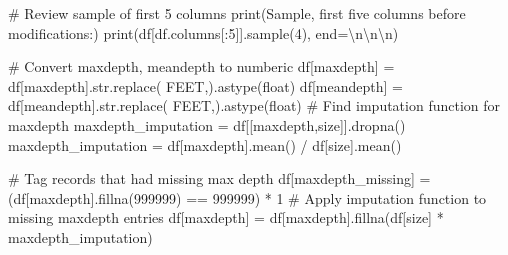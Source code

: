 \documentclass[
]{article}
\newenvironment{Shaded}{\begin{snugshade}}{\end{snugshade}}
\newcommand{\BuiltInTok}[1]{\textcolor[rgb]{0.00,0.23,0.31}{#1}}
\newcommand{\CharTok}[1]{\textcolor[rgb]{0.13,0.47,0.30}{#1}}
\newcommand{\CommentTok}[1]{\textcolor[rgb]{0.37,0.37,0.37}{#1}}
\newcommand{\DecValTok}[1]{\textcolor[rgb]{0.68,0.00,0.00}{#1}}
\newcommand{\NormalTok}[1]{\textcolor[rgb]{0.00,0.23,0.31}{#1}}
\newcommand{\OperatorTok}[1]{\textcolor[rgb]{0.37,0.37,0.37}{#1}}
\newcommand{\StringTok}[1]{\textcolor[rgb]{0.13,0.47,0.30}{#1}}
\begin{document}
\begin{Shaded}
\begin{Highlighting}[]
\CommentTok{\# Review sample of first 5 columns}
\BuiltInTok{print}\NormalTok{(}\StringTok{\textquotesingle{}Sample, first five columns before modifications:\textquotesingle{}}\NormalTok{)}
\BuiltInTok{print}\NormalTok{(df[df.columns[:}\DecValTok{5}\NormalTok{]].sample(}\DecValTok{4}\NormalTok{), end}\OperatorTok{=}\StringTok{\textquotesingle{}}\CharTok{\textbackslash{}n\textbackslash{}n\textbackslash{}n}\StringTok{\textquotesingle{}}\NormalTok{)}

\CommentTok{\# Convert maxdepth, meandepth to numberic}
\NormalTok{df[}\StringTok{\textquotesingle{}maxdepth\textquotesingle{}}\NormalTok{] }\OperatorTok{=}\NormalTok{ df[}\StringTok{\textquotesingle{}maxdepth\textquotesingle{}}\NormalTok{].}\BuiltInTok{str}\NormalTok{.replace(}\StringTok{\textquotesingle{} FEET\textquotesingle{}}\NormalTok{,}\StringTok{\textquotesingle{}\textquotesingle{}}\NormalTok{).astype(}\StringTok{\textquotesingle{}float\textquotesingle{}}\NormalTok{)}
\NormalTok{df[}\StringTok{\textquotesingle{}meandepth\textquotesingle{}}\NormalTok{] }\OperatorTok{=}\NormalTok{ df[}\StringTok{\textquotesingle{}meandepth\textquotesingle{}}\NormalTok{].}\BuiltInTok{str}\NormalTok{.replace(}\StringTok{\textquotesingle{} FEET\textquotesingle{}}\NormalTok{,}\StringTok{\textquotesingle{}\textquotesingle{}}\NormalTok{).astype(}\StringTok{\textquotesingle{}float\textquotesingle{}}\NormalTok{)}
\CommentTok{\# Find imputation function for maxdepth}
\NormalTok{maxdepth\_imputation }\OperatorTok{=}\NormalTok{ df[[}\StringTok{\textquotesingle{}maxdepth\textquotesingle{}}\NormalTok{,}\StringTok{\textquotesingle{}size\textquotesingle{}}\NormalTok{]].dropna()}
\NormalTok{maxdepth\_imputation }\OperatorTok{=}\NormalTok{ df[}\StringTok{\textquotesingle{}maxdepth\textquotesingle{}}\NormalTok{].mean() }\OperatorTok{/}\NormalTok{ df[}\StringTok{\textquotesingle{}size\textquotesingle{}}\NormalTok{].mean()}

\CommentTok{\# Tag records that had missing max depth}
\NormalTok{df[}\StringTok{\textquotesingle{}maxdepth\_missing\textquotesingle{}}\NormalTok{] }\OperatorTok{=}\NormalTok{ (df[}\StringTok{\textquotesingle{}maxdepth\textquotesingle{}}\NormalTok{].fillna(}\DecValTok{999999}\NormalTok{) }\OperatorTok{==} \DecValTok{999999}\NormalTok{) }\OperatorTok{*} \DecValTok{1}
\CommentTok{\# Apply imputation function to missing maxdepth entries}
\NormalTok{df[}\StringTok{\textquotesingle{}maxdepth\textquotesingle{}}\NormalTok{] }\OperatorTok{=}\NormalTok{ df[}\StringTok{\textquotesingle{}maxdepth\textquotesingle{}}\NormalTok{].fillna(df[}\StringTok{\textquotesingle{}size\textquotesingle{}}\NormalTok{] }\OperatorTok{*}\NormalTok{ maxdepth\_imputation)}


\end{Highlighting}
\end{Shaded}
\end{document}
